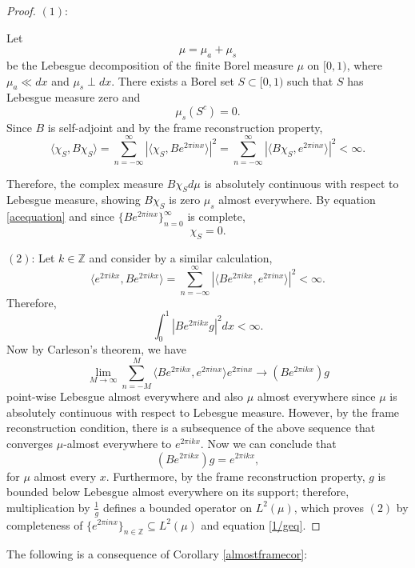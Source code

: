 \documentclass[11pt]{amsart}
\theoremstyle{definition}
\numberwithin{equation}{section}
\begin{document}
\begin{proof}
$(1)$:

Let $$\mu = \mu_a + \mu_s$$ be the Lebesgue decomposition of the finite Borel measure \(\mu\) on \([0,1)\), where \(\mu_a \ll dx\) and \(\mu_s \perp dx\). There exists a Borel set \(S \subset [0,1)\) such that \(S\) has Lebesgue measure zero and
\[
\mu_s(S^c) = 0.
\]
Since $B$ is self-adjoint and by the frame reconstruction property,
\begin{equation}\label{acequation}
\langle \chi_S, B\chi_S \rangle = \sum_{n=-\infty}^\infty \left| \langle \chi_S, B e^{2 \pi i n x} \rangle \right|^2 = \sum_{n=-\infty}^\infty \left| \langle B \chi_S, e^{2 \pi i n x} \rangle \right|^2<\infty.
\end{equation}

Therefore, the complex measure $B\chi_{S}d\mu$ is absolutely continuous with respect to Lebesgue measure, showing $B\chi_{S}$ is zero $\mu_{s}$ almost everywhere. By equation \eqref{acequation} and since $\{Be^{2\pi i nx}\}_{n=0}^{\infty}$ is complete, 
$$\chi_{S}=0.$$

$(2)$:
Let $k\in \mathbb{Z}$ and consider by a similar calculation,
$$\langle e^{2\pi ikx},Be^{2\pi i kx}\rangle=\sum_{n=-\infty}^{\infty}|\langle Be^{2\pi ikx}, e^{2\pi i nx}\rangle|^{2}<\infty. $$
Therefore, $$\int_{0}^{1}|Be^{2\pi ikx}g|^{2}dx<\infty.$$ Now by Carleson's theorem, we have
$$\lim_{M\to \infty}\sum_{n=-M}^{M}\langle Be^{2\pi ikx}, e^{2\pi i nx}\rangle e^{2\pi i nx}\to (Be^{2\pi ikx})g$$ point-wise Lebesgue almost everywhere and also $\mu$ almost everywhere since $\mu$ is absolutely continuous with respect to Lebesgue measure. However, by the frame reconstruction condition, there is a subsequence of the above sequence that converges $\mu$-almost everywhere to $e^{2\pi i kx}$.
Now we can conclude that \begin{equation}\label{1/geq}
(Be^{2\pi ikx})g=e^{2\pi ikx},\end{equation} for $\mu$ almost every $x$. Furthermore, by the frame reconstruction property, $g$ is bounded below Lebesgue almost everywhere on its support; therefore, multiplication by $\frac{1}{g}$ defines a bounded operator on $L^{2}(\mu)$, which proves $(2)$ by completeness of $\{e^{2\pi i nx}\}_{n\in \mathbb{Z}}\subseteq L^{2}(\mu)$ and equation \eqref{1/geq}.


\end{proof}
The following is a consequence of Corollary \ref{almostframecor}:
\end{document}
